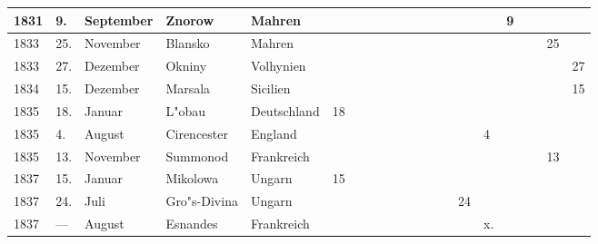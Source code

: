 \documentclass[a4paper, 8pt, oneside, polutonikogreek, german]{article}
\begin{document}
\begin{landscape}
\begin{table}[H]
\begin{longtable}{|p{5mm}|p{4mm}|p{13mm}|p{23mm}|p{16mm}|p{4mm}|p{6mm}|p{6mm}|p{6mm}|p{4mm}|p{5mm}|p{4mm}|p{5mm}|p{6mm}|p{5mm}|p{5mm}|p{5mm}|}
        1831 & 9. & September & Znorow & Mahren & ~ & ~ & ~ & ~ & ~ & ~ & ~ & ~ & 9 & ~ & ~ & ~ \\ \hline
        1833 & 25. & November & Blansko & Mahren & ~ & ~ & ~ & ~ & ~ & ~ & ~ & ~ & ~ & ~ & 25 & ~ \\ \hline
        1833 & 27. & Dezember & Okniny & Volhynien & ~ & ~ & ~ & ~ & ~ & ~ & ~ & ~ & ~ & ~ & ~ & 27 \\ \hline
        1834 & 15. & Dezember & Marsala & Sicilien & ~ & ~ & ~ & ~ & ~ & ~ & ~ & ~ & ~ & ~ & ~ & 15 \\ \hline
        1835 & 18. & Januar & L"obau & Deutschland & 18 & ~ & ~ & ~ & ~ & ~ & ~ & ~ & ~ & ~ & ~ & ~ \\ \hline
        1835 & 4. & August & Cirencester & England & ~ & ~ & ~ & ~ & ~ & ~ & ~ & 4 & ~ & ~ & ~ & ~ \\ \hline
        1835 & 13. & November & Summonod & Frankreich & ~ & ~ & ~ & ~ & ~ & ~ & ~ & ~ & ~ & ~ & 13 & ~ \\ \hline
        1837 & 15. & Januar & Mikolowa & Ungarn & 15 & ~ & ~ & ~ & ~ & ~ & ~ & ~ & ~ & ~ & ~ & ~ \\ \hline
        1837 & 24. & Juli & Gro"s-Divina & Ungarn & ~ & ~ & ~ & ~ & ~ & ~ & 24 & ~ & ~ & ~ & ~ & ~ \\ \hline
        1837 & --- & August & Esnandes & Frankreich & ~ & ~ & ~ & ~ & ~ & ~ & ~ & x. & ~ & ~ & ~ & ~ \\ \hline
    \end{longtable}
\end{table}
\end{landscape}
\clearpage
\end{document}
